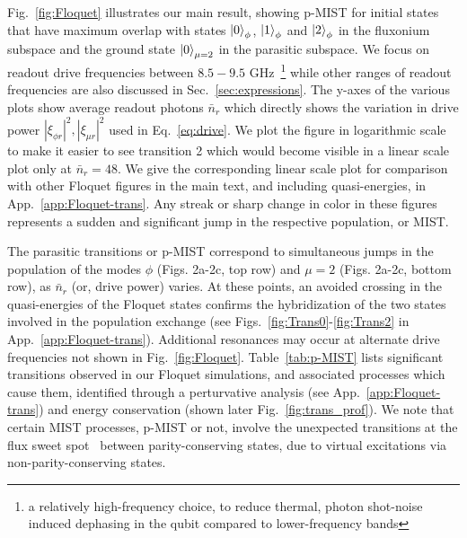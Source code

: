 \documentclass[%
reprint,
superscriptaddress,
 amsmath,amssymb,
 aps,
 prx,
longbibliography,
floatfix,
]{revtex4-2}
\begin{document}
Fig.~\ref{fig:Floquet} illustrates our main result, showing p-MIST for initial states that have maximum overlap with states $\ket{0}_\phi$, $\ket{1}_\phi$ and $\ket{2}_\phi$ in the fluxonium subspace and the ground state $\ket{0}_{\mu=2}$ in the parasitic subspace. We focus on readout drive frequencies between $8.5 - 9.5$ GHz~\footnote{a relatively high-frequency choice, to reduce thermal, photon shot-noise induced dephasing in the qubit compared to lower-frequency bands} while other ranges of readout frequencies are also discussed in Sec.~\ref{sec:expressions}. The y-axes of the various plots show average readout photons $\bar n_r$ which directly shows the variation in drive power $|\xi_{\phi r}|^2,|\xi_{\mu r}|^2$ used in Eq.~\ref{eq:drive}. We plot the figure in logarithmic scale to make it easier to see transition 2 which would become visible in a linear scale plot only at $\bar n_r=48$. We give the corresponding linear scale plot for comparison with other Floquet figures in the main text, and including quasi-energies, in App.~\ref{app:Floquet-trans}. Any streak or sharp change in color in these figures represents a sudden and significant jump in the respective population, or MIST. 

The parasitic transitions or p-MIST correspond to simultaneous jumps in the population of the modes $\phi$ (Figs. 2a-2c, top row) and $\mu=2$ (Figs. 2a-2c, bottom row), as $\bar{n}_r$ (or, drive power) varies. At these points, an avoided crossing in the quasi-energies of the Floquet states confirms the hybridization of the two states involved in the population exchange (see Figs.~\ref{fig:Trans0}-\ref{fig:Trans2} in App.~\ref{app:Floquet-trans}). Additional resonances may occur at alternate drive frequencies not shown in Fig.~\ref{fig:Floquet}. Table~\ref{tab:p-MIST} lists significant transitions observed in our Floquet simulations, and associated processes which cause them, identified through a perturvative analysis (see App.~\ref{app:Floquet-trans}) and energy conservation (shown later Fig.~\ref{fig:trans_prof}). We note that certain MIST processes, p-MIST or not, involve the unexpected transitions at the flux sweet spot~\cite{zhu_circuit_2013} between parity-conserving states, due to virtual excitations via non-parity-conserving states. 
\end{document}
